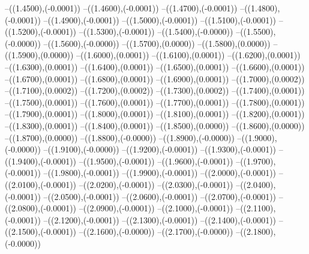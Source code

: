 {	--({\sx*(1.4500)},{\sy*(-0.0001)})
	--({\sx*(1.4600)},{\sy*(-0.0001)})
	--({\sx*(1.4700)},{\sy*(-0.0001)})
	--({\sx*(1.4800)},{\sy*(-0.0001)})
	--({\sx*(1.4900)},{\sy*(-0.0001)})
	--({\sx*(1.5000)},{\sy*(-0.0001)})
	--({\sx*(1.5100)},{\sy*(-0.0001)})
	--({\sx*(1.5200)},{\sy*(-0.0001)})
	--({\sx*(1.5300)},{\sy*(-0.0001)})
	--({\sx*(1.5400)},{\sy*(-0.0000)})
	--({\sx*(1.5500)},{\sy*(-0.0000)})
	--({\sx*(1.5600)},{\sy*(-0.0000)})
	--({\sx*(1.5700)},{\sy*(0.0000)})
	--({\sx*(1.5800)},{\sy*(0.0000)})
	--({\sx*(1.5900)},{\sy*(0.0000)})
	--({\sx*(1.6000)},{\sy*(0.0001)})
	--({\sx*(1.6100)},{\sy*(0.0001)})
	--({\sx*(1.6200)},{\sy*(0.0001)})
	--({\sx*(1.6300)},{\sy*(0.0001)})
	--({\sx*(1.6400)},{\sy*(0.0001)})
	--({\sx*(1.6500)},{\sy*(0.0001)})
	--({\sx*(1.6600)},{\sy*(0.0001)})
	--({\sx*(1.6700)},{\sy*(0.0001)})
	--({\sx*(1.6800)},{\sy*(0.0001)})
	--({\sx*(1.6900)},{\sy*(0.0001)})
	--({\sx*(1.7000)},{\sy*(0.0002)})
	--({\sx*(1.7100)},{\sy*(0.0002)})
	--({\sx*(1.7200)},{\sy*(0.0002)})
	--({\sx*(1.7300)},{\sy*(0.0002)})
	--({\sx*(1.7400)},{\sy*(0.0001)})
	--({\sx*(1.7500)},{\sy*(0.0001)})
	--({\sx*(1.7600)},{\sy*(0.0001)})
	--({\sx*(1.7700)},{\sy*(0.0001)})
	--({\sx*(1.7800)},{\sy*(0.0001)})
	--({\sx*(1.7900)},{\sy*(0.0001)})
	--({\sx*(1.8000)},{\sy*(0.0001)})
	--({\sx*(1.8100)},{\sy*(0.0001)})
	--({\sx*(1.8200)},{\sy*(0.0001)})
	--({\sx*(1.8300)},{\sy*(0.0001)})
	--({\sx*(1.8400)},{\sy*(0.0001)})
	--({\sx*(1.8500)},{\sy*(0.0000)})
	--({\sx*(1.8600)},{\sy*(0.0000)})
	--({\sx*(1.8700)},{\sy*(0.0000)})
	--({\sx*(1.8800)},{\sy*(-0.0000)})
	--({\sx*(1.8900)},{\sy*(-0.0000)})
	--({\sx*(1.9000)},{\sy*(-0.0000)})
	--({\sx*(1.9100)},{\sy*(-0.0000)})
	--({\sx*(1.9200)},{\sy*(-0.0001)})
	--({\sx*(1.9300)},{\sy*(-0.0001)})
	--({\sx*(1.9400)},{\sy*(-0.0001)})
	--({\sx*(1.9500)},{\sy*(-0.0001)})
	--({\sx*(1.9600)},{\sy*(-0.0001)})
	--({\sx*(1.9700)},{\sy*(-0.0001)})
	--({\sx*(1.9800)},{\sy*(-0.0001)})
	--({\sx*(1.9900)},{\sy*(-0.0001)})
	--({\sx*(2.0000)},{\sy*(-0.0001)})
	--({\sx*(2.0100)},{\sy*(-0.0001)})
	--({\sx*(2.0200)},{\sy*(-0.0001)})
	--({\sx*(2.0300)},{\sy*(-0.0001)})
	--({\sx*(2.0400)},{\sy*(-0.0001)})
	--({\sx*(2.0500)},{\sy*(-0.0001)})
	--({\sx*(2.0600)},{\sy*(-0.0001)})
	--({\sx*(2.0700)},{\sy*(-0.0001)})
	--({\sx*(2.0800)},{\sy*(-0.0001)})
	--({\sx*(2.0900)},{\sy*(-0.0001)})
	--({\sx*(2.1000)},{\sy*(-0.0001)})
	--({\sx*(2.1100)},{\sy*(-0.0001)})
	--({\sx*(2.1200)},{\sy*(-0.0001)})
	--({\sx*(2.1300)},{\sy*(-0.0001)})
	--({\sx*(2.1400)},{\sy*(-0.0001)})
	--({\sx*(2.1500)},{\sy*(-0.0001)})
	--({\sx*(2.1600)},{\sy*(-0.0000)})
	--({\sx*(2.1700)},{\sy*(-0.0000)})
	--({\sx*(2.1800)},{\sy*(-0.0000)})
}
